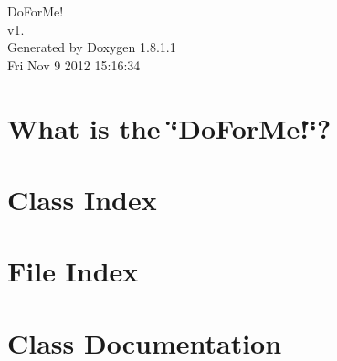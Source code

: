 \documentclass{book}
\begin{document}
\hypersetup{pageanchor=false,citecolor=blue}
\begin{titlepage}
\vspace*{7cm}
\begin{center}
{\Large Do\-For\-Me! \\[1ex]\large v1. }\\
\vspace*{1cm}
{\large Generated by Doxygen 1.8.1.1}\\
\vspace*{0.5cm}
{\small Fri Nov 9 2012 15:16:34}\\
\end{center}
\end{titlepage}
\clearemptydoublepage
{}
\tableofcontents
\clearemptydoublepage
{}
\hypersetup{pageanchor=true,citecolor=blue}
\chapter{What is the \char`\"{}\-Do\-For\-Me!\char`\"{}?}
\label{index}\hypertarget{index}{}
\chapter{Class Index}

\chapter{File Index}

\chapter{Class Documentation}























\end{document}
